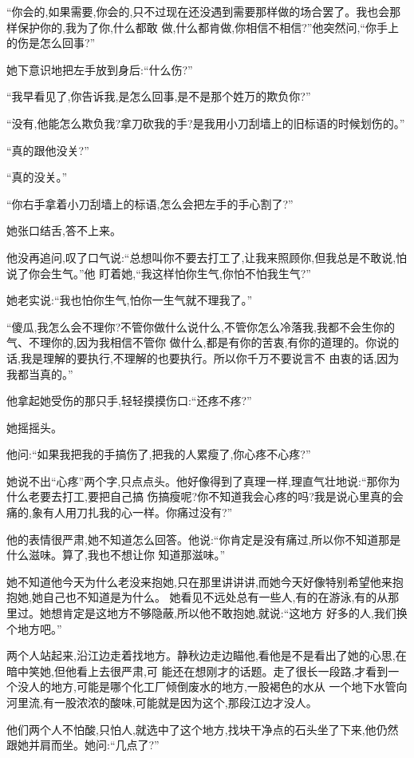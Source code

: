 ﻿\documentclass[12pt]{article}
\begin{document}
``你会的,如果需要,你会的,只不过现在还没遇到需要那样做的场合罢了。我也会那样保护你的,我为了你,什么都敢
做,什么都肯做,你相信不相信?''他突然问,``你手上的伤是怎么回事?''

她下意识地把左手放到身后:``什么伤?''

``我早看见了,你告诉我,是怎么回事,是不是那个姓万的欺负你?''

``没有,他能怎么欺负我?拿刀砍我的手?是我\myrule 用小刀刮墙上的旧标语的时候划伤的。''

``真的跟他没关?''

``真的没关。''

``你右手拿着小刀刮墙上的标语,怎么会把左手的手心割了?''

她张口结舌,答不上来。

他没再追问,叹了口气说:``总想叫你不要去打工了,让我\myrule 来照顾你,但我总是不敢说,怕说了你会生气。''他
盯着她,``我这样怕你生气,你怕不怕我生气?''

她老实说:``我\myrule 也怕你生气,怕你一生气\myrule 就\myrule 不理我了。''

``傻瓜,我怎么会不理你?不管你做什么说什么,不管你怎么冷落我,我都不会生你的气、不理你的,因为我相信不管你
做什么,都是有你的苦衷,有你的道理的。你说的话,我是理解的要执行,不理解的也要执行。所以你千万不要说言不
由衷的话,因为我都当真的。''

他拿起她受伤的那只手,轻轻摸摸伤口:``还疼不疼?''

她摇摇头。

他问:``如果我把我的手搞伤了,把我的人累瘦了,你心疼不心疼?''

她说不出``心疼''两个字,只点点头。他好像得到了真理一样,理直气壮地说:``那你为什么老要去打工,要把自己搞
伤搞瘦呢?你不知道我会\myrule 心疼的吗?我是说心里真的会痛的,象有人用刀扎我的心一样。你痛过没有?''

他的表情很严肃,她不知道怎么回答。他说:``你肯定是没有痛过,所以你不知道那是什么滋味。算了,我也不想让你
知道那滋味。''

她不知道他今天为什么老没来抱她,只在那里讲讲讲,而她今天好像特别希望他来抱抱她,她自己也不知道是为什么。
她看见不远处总有一些人,有的在游泳,有的从那里过。她想肯定是这地方不够隐蔽,所以他不敢抱她,就说:``这地方
好多的人,我们换个地方吧。''

两个人站起来,沿江边走着找地方。静秋边走边瞄他,看他是不是看出了她的心思,在暗中笑她,但他看上去很严肃,可
能还在想刚才的话题。走了很长一段路,才看到一个没人的地方,可能是哪个化工厂倾倒废水的地方,一股褐色的水从
一个地下水管向河里流,有一股浓浓的酸味,可能就是因为这个,那段江边才没人。

他们两个人不怕酸,只怕人,就选中了这个地方,找块干净点的石头坐了下来,他仍然跟她并肩而坐。她问:``几点了?''
\end{document}
